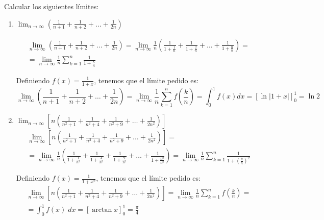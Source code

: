 \begin{ejercicio} Calcular los siguientes límites:
\begin{enumerate}
    \item $\displaystyle \lim_{n\to\infty} \left(\frac{1}{n+1} + \frac{1}{n+2} + \dots + \frac{1}{2n} \right)$

    \begin{multline*}
        \lim_{n\to\infty} \left(\frac{1}{n+1} + \frac{1}{n+2} + \dots + \frac{1}{2n} \right)
        = \lim_{n\to\infty} \frac{1}{n}\left(\frac{1}{1+\frac{1}{n}} + \frac{1}{1+\frac{2}{n}} + \dots + \frac{1}{1+\frac{n}{n}} \right)
        =\\= \lim_{n\to\infty} \frac{1}{n} \sum_{k=1}^n \frac{1}{1+\frac{k}{n}}
    \end{multline*}

    Definiendo $f(x)=\frac{1}{1+x}$, tenemos que el límite pedido es:
    \begin{equation*}
        \lim_{n\to\infty} \left(\frac{1}{n+1} + \frac{1}{n+2} + \dots + \frac{1}{2n} \right)
        = \lim_{n\to\infty} \frac{1}{n} \sum_{k=1}^n f\left(\frac{k}{n}\right)
        = \int_0^1 f(x)dx = \left[\ln |1+x|\right]_0^1 = \ln 2
    \end{equation*}

    \item $\displaystyle \lim_{n\to\infty} \left[n\left(\frac{1}{n^2 +1} + \frac{1}{n^2+4} + \frac{1}{n^2+ 9} + \dots + \frac{1}{2n^2} \right)\right]$
    \begin{multline*}
        \lim_{n\to\infty} \left[n\left(\frac{1}{n^2 +1} + \frac{1}{n^2+4} + \frac{1}{n^2+ 9} + \dots + \frac{1}{2n^2} \right)\right]
        =\\= \lim_{n\to\infty} \frac{1}{n}\left(\frac{1}{1+\frac{1}{n^2}} + \frac{1}{1+\frac{4}{n^2}} + \frac{1}{1+\frac{9}{n^2}} + \dots + \frac{1}{1+\frac{n^2}{n^2}} \right)
        =  \lim_{n\to\infty} \frac{1}{n}\sum_{k=1}^n \frac{1}{1+\left(\frac{k}{n}\right)^2}
    \end{multline*}

    Definiendo $f(x)=\frac{1}{1+x^2}$, tenemos que el límite pedido es:
    \begin{multline*}
        \lim_{n\to\infty} \left[n\left(\frac{1}{n^2 +1} + \frac{1}{n^2+4} + \frac{1}{n^2+ 9} + \dots + \frac{1}{2n^2} \right)\right]
        = \lim_{n\to\infty} \frac{1}{n}\sum_{k=1}^n f\left(\frac{k}{n}\right)
        =\\= \int_0^1 f(x)\;dx = \left[\arctan x\right]_0^1 = \frac{\pi}{4}
    \end{multline*}


\end{enumerate}
\end{ejercicio}
